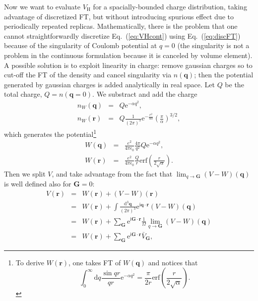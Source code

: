 \documentclass[a4paper,twocolumn,12pt]{article}
\begin{document}
Now we want to evaluate $V_\text{H}$ for a spacially-bounded charge
distribution, taking advantage of discretized FT, but without
introducing spurious effect due to periodically repeated replicas.
Mathematically, there is the problem that one cannot straightforwardly
discretize Eq.~(\ref{eq:VHcont}) using Eq.~(\ref{eq:discFT}) because
of the singularity of Coulomb potential at $q=0$ (the singularity is
not a problem in the continuous formulation because it is canceled by
volume element).  A possible solution is to exploit linearity in
charge: remove gaussian charges so to cut-off the FT of the density
and cancel singularity via $n(\mathbf{q})$; then the potential
generated by gaussian charges is added analytically in real space.
Let $Q$ be the total charge, $Q=n(\mathbf{q}=0)$.  We substract and
add the charge
\begin{eqnarray}
n_W(\mathbf{q})&=&Q\mathrm{e}^{-\alpha q^2}, \\
n_W(\mathbf{r})&=&Q \frac{1}{(2\pi)^3} \mathrm{e}^{-\frac{r^2}{4\alpha}}\left(\frac{\pi}{\alpha}\right)^{3/2},
\end{eqnarray}
which generates the potential\footnote{To derive $W(\mathbf{r})$, one
takes FT of $W(\mathbf{q})$ and notices that $$\int_0^\infty
\mathrm{d}q \frac{\sin{qr}}{qr}\mathrm{e}^{-\alpha q^2}
=\frac{\pi}{2r}\text{erf}\left(\frac{r}{2\sqrt{\alpha}}\right).$$}
\begin{eqnarray}
W(\mathbf{q})&=&\frac{e^2}{4\pi\epsilon_0}\frac{4\pi}{q^2}Q\mathrm{e}^{-\alpha q^2},\\
W(\mathbf{r})&=&\frac{e^2}{4\pi\epsilon_0}\frac{Q}{r}\text{erf}\left(\frac{r}{2\sqrt{\alpha}}\right).
\end{eqnarray}
Then we split $V$, and take advantage from the fact that
$\lim_{q\rightarrow\mathbf{G}}(V-W)(\mathbf{q})$ is well defined also
for $\mathbf{G}=0$:
\begin{eqnarray}
V(\mathbf{r})&=&W(\mathbf{r})+(V-W)(\mathbf{r})\\
&=&W(\mathbf{r}) + \int \frac{\mathrm{d}^3\mathbf{q}}{(2\pi)^3} \mathrm{e}^{ \mathrm{i} \mathbf{q} \cdot \mathbf{r}}(V-W)(\mathbf{q})\nonumber\\
&=&W(\mathbf{r}) + \sum_\mathbf{G} \mathrm{e}^{\mathrm{i}\mathbf{G}\cdot\mathbf{r}}\frac{1}{\Omega}\lim_{q\rightarrow\mathbf{G}}(V-W)(\mathbf{q})\nonumber\\
&=&W(\mathbf{r}) + \sum_\mathbf{G} \mathrm{e}^{\mathrm{i}\mathbf{G}\cdot\mathbf{r}} \bar{V}_\mathbf{G},
\end{eqnarray}
\end{document}
